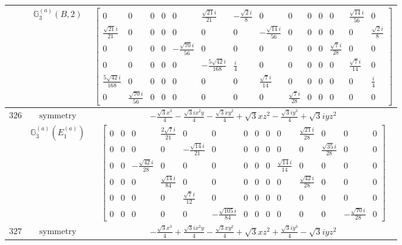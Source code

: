 \documentclass[fleqn,8pt,landscape]{jsarticle}
\begin{document}
\begin{longtable}{ccc}
$  $ & $ \mathbb{G}_{3}^{(a)}(B,2) $ & $ \begin{bmatrix} 0 & 0 & 0 & 0 & 0 & \frac{\sqrt{21} i}{21} & - \frac{\sqrt{2} i}{8} & 0 & 0 & 0 & 0 & 0 & \frac{\sqrt{14} i}{56} & 0 \\ \frac{\sqrt{21} i}{21} & 0 & 0 & 0 & 0 & 0 & 0 & - \frac{\sqrt{14} i}{56} & 0 & 0 & 0 & 0 & 0 & \frac{\sqrt{2} i}{8} \\ 0 & 0 & 0 & 0 & - \frac{\sqrt{70} i}{56} & 0 & 0 & 0 & 0 & 0 & 0 & \frac{\sqrt{7} i}{28} & 0 & 0 \\ 0 & 0 & 0 & 0 & 0 & - \frac{5 \sqrt{42} i}{168} & \frac{i}{4} & 0 & 0 & 0 & 0 & 0 & \frac{\sqrt{7} i}{14} & 0 \\ \frac{5 \sqrt{42} i}{168} & 0 & 0 & 0 & 0 & 0 & 0 & \frac{\sqrt{7} i}{14} & 0 & 0 & 0 & 0 & 0 & \frac{i}{4} \\ 0 & \frac{\sqrt{70} i}{56} & 0 & 0 & 0 & 0 & 0 & 0 & \frac{\sqrt{7} i}{28} & 0 & 0 & 0 & 0 & 0 \end{bmatrix} $ \\ \hline
$ 326 $ & $ \text{symmetry} $ & $ - \frac{\sqrt{3} x^{3}}{4} - \frac{\sqrt{3} i x^{2} y}{4} - \frac{\sqrt{3} x y^{2}}{4} + \sqrt{3} x z^{2} - \frac{\sqrt{3} i y^{3}}{4} + \sqrt{3} i y z^{2} $ \\
$  $ & $ \mathbb{G}_{3}^{(a)}(E_{1}^{(a)}) $ & $ \begin{bmatrix} 0 & 0 & 0 & \frac{2 \sqrt{7} i}{21} & 0 & 0 & 0 & 0 & 0 & 0 & \frac{\sqrt{21} i}{28} & 0 & 0 & 0 \\ 0 & 0 & 0 & 0 & - \frac{\sqrt{14} i}{21} & 0 & 0 & 0 & 0 & 0 & 0 & \frac{\sqrt{35} i}{28} & 0 & 0 \\ 0 & 0 & - \frac{\sqrt{42} i}{28} & 0 & 0 & 0 & 0 & 0 & 0 & \frac{\sqrt{14} i}{14} & 0 & 0 & 0 & 0 \\ 0 & 0 & 0 & \frac{\sqrt{14} i}{84} & 0 & 0 & 0 & 0 & 0 & 0 & \frac{\sqrt{42} i}{28} & 0 & 0 & 0 \\ 0 & 0 & 0 & 0 & \frac{\sqrt{7} i}{12} & 0 & 0 & 0 & 0 & 0 & 0 & 0 & 0 & 0 \\ 0 & 0 & 0 & 0 & 0 & - \frac{\sqrt{105} i}{84} & 0 & 0 & 0 & 0 & 0 & 0 & - \frac{\sqrt{70} i}{28} & 0 \end{bmatrix} $ \\ \hline
$ 327 $ & $ \text{symmetry} $ & $ - \frac{\sqrt{3} x^{3}}{4} + \frac{\sqrt{3} i x^{2} y}{4} - \frac{\sqrt{3} x y^{2}}{4} + \sqrt{3} x z^{2} + \frac{\sqrt{3} i y^{3}}{4} - \sqrt{3} i y z^{2} $ \\

\end{longtable}
\end{document}
